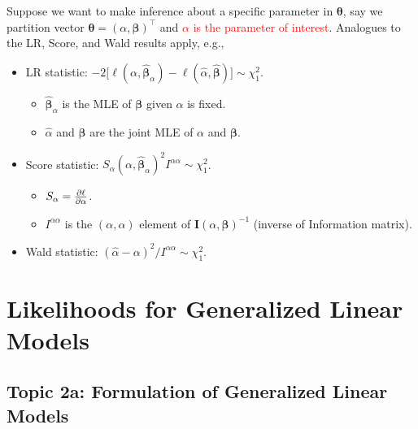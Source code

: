 \documentclass[oneside]{book}\usepackage[]{graphicx}\usepackage[svgnames]{xcolor}
\providecommand{\Vector}[1]{\bm{#1}}%
\providecommand{\Matrix}[1]{\bm{#1}}
\begin{document}
Suppose we want to make inference about a specific parameter in $ \Vector{\theta} $, say we
partition vector $ \Vector{\theta}=(\alpha,\Vector{\beta})^\top $ and \textcolor{Red}{$ \alpha $
      is the parameter of interest}. Analogues to the LR, Score, and Wald results apply, e.g.,
\begin{itemize}
      \item LR statistic: $ -2\bigl[\ell(\alpha,\hat{\Vector{\beta}}_{\alpha})-\ell(\hat{\alpha},\hat{\Vector{\beta}})\bigr]\sim \chi^2_{1} $.
            \begin{itemize}
                  \item $ \hat{\Vector{\beta}}_{\alpha} $ is the MLE of $ \Vector{\beta} $ given $ \alpha $ is fixed.
                  \item $ \hat{\alpha} $ and $ \hat{\Vector{\beta}} $ are the joint MLE of $ \alpha $ and $ \Vector{\beta} $.
            \end{itemize}
      \item Score statistic: $ S_\alpha(\alpha,\hat{\Vector{\beta}}_\alpha)^2 I^{\alpha\alpha}\sim \chi^2_{1} $.
            \begin{itemize}
                  \item $ S_\alpha=\pdv{\ell}{\alpha} $.
                  \item $ I^{\alpha\alpha} $ is the $ (\alpha,\alpha) $ element of $ \Matrix{I}(\alpha,\Vector{\beta})^{-1} $ (inverse of Information matrix).
            \end{itemize}
      \item Wald statistic: $ (\hat{\alpha}-\alpha)^2/I^{\alpha\alpha}\sim \chi^2_{1} $.
\end{itemize}

\chapter{Likelihoods for Generalized Linear Models}
\section*{Topic 2a: Formulation of Generalized Linear Models}
\end{document}
